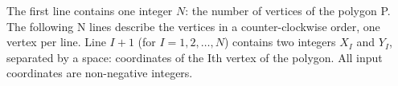 The first line contains one integer $N$: the number of vertices of the polygon P. The following N lines describe the vertices in a counter-clockwise order, one vertex per line. Line $I+1$ (for $I = 1, 2, \ldots, N$) contains two integers $X_I$ and $Y_I$, separated by a space: coordinates of the Ith vertex of the polygon. All input coordinates are non-negative integers.